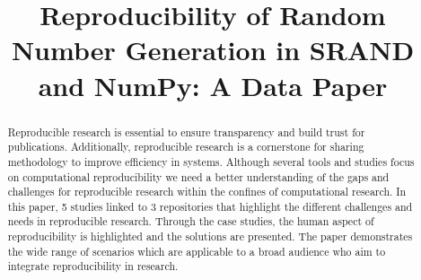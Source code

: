 \documentclass{article}
\title{Reproducibility of Random Number Generation in SRAND and NumPy: A Data Paper}
\author{Dobromir Iliev$ \\
\small $^$Sandia National Labratories, Sugar Hill, USA \\
}
\date{}
\begin{document}
\maketitle

\begin{abstract}
Reproducible research is essential to ensure transparency and build trust for publications. Additionally,
reproducible research is a cornerstone for sharing methodology to improve efficiency in systems. Although several
tools and studies focus on computational reproducibility we need a better understanding of the gaps and
challenges for reproducible research within the confines of computational research. In this paper, 5 studies linked
to 3 repositories that highlight the different challenges and needs in reproducible research. Through the case
studies, the human aspect of reproducibility is highlighted and the solutions are presented. The paper
demonstrates the wide range of scenarios which are applicable to a broad audience who aim to integrate
reproducibility in research.
\end{abstract}

\noindent{}
\end{document}
